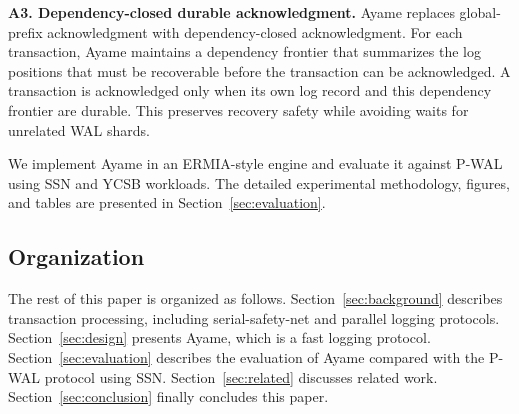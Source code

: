 \noindent\textbf{A3. Dependency-closed durable acknowledgment.}
Ayame replaces global-prefix acknowledgment with dependency-closed
acknowledgment.  For each transaction, Ayame maintains a dependency frontier
that summarizes the log positions that must be recoverable before the
transaction can be acknowledged.  A transaction is acknowledged only when its own
log record and this dependency frontier are durable.  This preserves recovery
safety while avoiding waits for unrelated WAL shards.

We implement Ayame in an ERMIA-style engine and evaluate it against P-WAL
using SSN and YCSB workloads.  The detailed experimental methodology, figures,
and tables are presented in Section~\ref{sec:evaluation}.

\subsection{Organization}
\label{sec:introduction-organization}

The rest of this paper is organized as follows.
Section~\ref{sec:background} describes transaction processing, including serial-safety-net and parallel logging protocols.
%
Section~\ref{sec:design} presents Ayame, which is a fast logging protocol. 
%
Section~\ref{sec:evaluation} describes the evaluation of Ayame compared with the P-WAL protocol using SSN.
%
Section~\ref{sec:related} discusses related work.
%
Section~\ref{sec:conclusion} finally concludes this paper.
